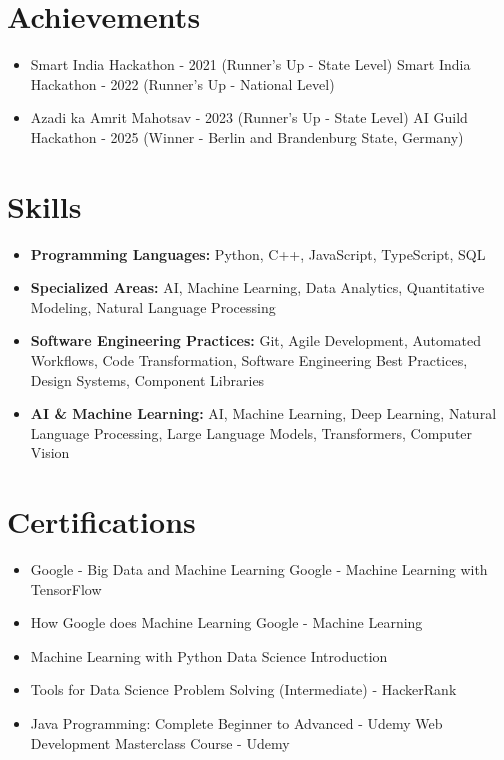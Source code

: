 \documentclass[a4paper,10pt]{article}
\begin{document}
\section*{Achievements}
\begin{itemize}
\item Smart India Hackathon - 2021 (Runner's Up - State Level) \hfill Smart India Hackathon - 2022 (Runner's Up - National Level)
\item Azadi ka Amrit Mahotsav - 2023 (Runner's Up - State Level) \hfill AI Guild Hackathon - 2025 (Winner - Berlin and Brandenburg State, Germany)
\end{itemize}

\section*{Skills}
\begin{itemize}
  \item \textbf{Programming Languages:} Python, C++, JavaScript, TypeScript, SQL
  \item \textbf{Specialized Areas:} AI, Machine Learning, Data Analytics, Quantitative Modeling, Natural Language Processing
  \item \textbf{Software Engineering Practices:} Git, Agile Development, Automated Workflows, Code Transformation, Software Engineering Best Practices, Design Systems, Component Libraries
  \item \textbf{AI \& Machine Learning:} AI, Machine Learning, Deep Learning, Natural Language Processing, Large Language Models, Transformers, Computer Vision
\end{itemize}

\section*{Certifications}
\begin{itemize}
\item Google - Big Data and Machine Learning \hfill Google - Machine Learning with TensorFlow
\item How Google does Machine Learning \hfill Google - Machine Learning
\item Machine Learning with Python \hfill Data Science Introduction
\item Tools for Data Science \hfill Problem Solving (Intermediate) - HackerRank
\item Java Programming: Complete Beginner to Advanced - Udemy \hfill Web Development Masterclass Course - Udemy
\end{itemize}
\end{document}
